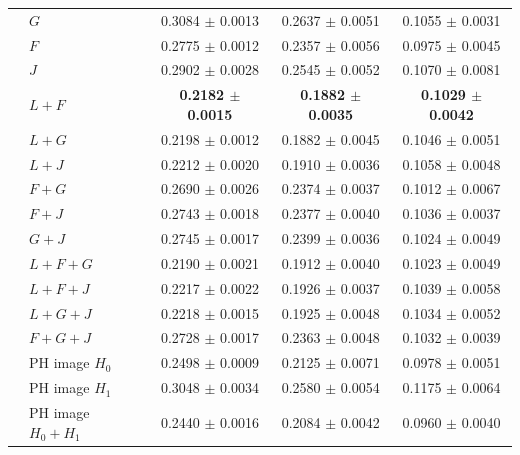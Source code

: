 \documentclass[10pt,a4paper]{article}
\newcommand{\B}[1]{\textbf{#1}}
\begin{document}
\begin{longtable}{@{}ll ccc@{}}
 & $G$ & 0.3084 $\pm$ 0.0013 & 0.2637 $\pm$ 0.0051 & 0.1055 $\pm$ 0.0031\\
 & $F$ & 0.2775 $\pm$ 0.0012 & 0.2357 $\pm$ 0.0056 & 0.0975 $\pm$ 0.0045\\
 & $J$ & 0.2902 $\pm$ 0.0028 & 0.2545 $\pm$ 0.0052 & 0.1070 $\pm$ 0.0081\\
 & \B{$L{+}F$} & \B{0.2182 $\pm$ 0.0015} & \B{0.1882 $\pm$ 0.0035} & \B{0.1029 $\pm$ 0.0042}\\
 & $L{+}G$ & 0.2198 $\pm$ 0.0012 & 0.1882 $\pm$ 0.0045 & 0.1046 $\pm$ 0.0051\\
 & $L{+}J$ & 0.2212 $\pm$ 0.0020 & 0.1910 $\pm$ 0.0036 & 0.1058 $\pm$ 0.0048\\
 & $F{+}G$ & 0.2690 $\pm$ 0.0026 & 0.2374 $\pm$ 0.0037 & 0.1012 $\pm$ 0.0067\\
 & $F{+}J$ & 0.2743 $\pm$ 0.0018 & 0.2377 $\pm$ 0.0040 & 0.1036 $\pm$ 0.0037\\
 & $G{+}J$ & 0.2745 $\pm$ 0.0017 & 0.2399 $\pm$ 0.0036 & 0.1024 $\pm$ 0.0049\\
 & $L{+}F{+}G$ & 0.2190 $\pm$ 0.0021 & 0.1912 $\pm$ 0.0040 & 0.1023 $\pm$ 0.0049\\
 & $L{+}F{+}J$ & 0.2217 $\pm$ 0.0022 & 0.1926 $\pm$ 0.0037 & 0.1039 $\pm$ 0.0058\\
 & $L{+}G{+}J$ & 0.2218 $\pm$ 0.0015 & 0.1925 $\pm$ 0.0048 & 0.1034 $\pm$ 0.0052\\
 & $F{+}G{+}J$ & 0.2728 $\pm$ 0.0017 & 0.2363 $\pm$ 0.0048 & 0.1032 $\pm$ 0.0039\\
 & PH image $H_0$ & 0.2498 $\pm$ 0.0009 & 0.2125 $\pm$ 0.0071 & 0.0978 $\pm$ 0.0051\\
 & PH image $H_1$ & 0.3048 $\pm$ 0.0034 & 0.2580 $\pm$ 0.0054 & 0.1175 $\pm$ 0.0064\\
 & PH image $H_0{+}H_1$ & 0.2440 $\pm$ 0.0016 & 0.2084 $\pm$ 0.0042 & 0.0960 $\pm$ 0.0040\\
\end{longtable}
\end{document}
